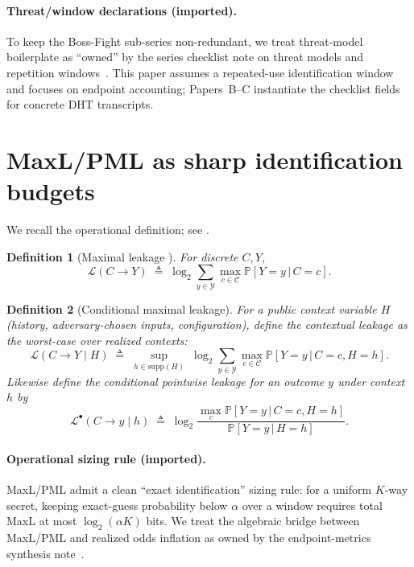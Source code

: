 \documentclass[11pt]{article}
\newcommand{\Prb}{\mathbb{P}}
\newcommand{\supp}{\mathrm{supp}}
\newcommand{\MaxL}{\mathcal{L}}
\newcommand{\PML}{\mathcal{L}^{\bullet}}
\newcommand{\given}{\,|\,}
\newcommand{\logtwo}{\log_2}
\newcommand{\C}{\mathcal{C}} %
\newcommand{\Y}{\mathcal{Y}} %
\newtheorem{definition}{Definition}
\begin{document}
\paragraph{Threat/window declarations (imported).}
To keep the Boss-Fight sub-series non-redundant, we treat threat-model boilerplate as ``owned'' by the series checklist note on threat models and repetition windows~\cite{series:threatwindows}.
This paper assumes a repeated-use identification window and focuses on endpoint accounting; Papers~B--C instantiate the checklist fields for concrete DHT transcripts.

\section{MaxL/PML as sharp identification budgets}\label{sec:maxl}
We recall the operational definition; see \cite{issa2020operational}.

\begin{definition}[Maximal leakage \cite{issa2020operational}]
For discrete $C,Y$,
\[
\MaxL(C\!\to\!Y)\;\triangleq\;\logtwo\sum_{y\in\Y}\max_{c\in\C}\Prb[Y=y\given C=c].
\]
\end{definition}


\begin{definition}[Conditional maximal leakage]\label{def:condmaxl}
For a public context variable $H$ (history, adversary-chosen inputs, configuration), define the \emph{contextual} leakage as the worst-case over realized contexts:
\[
\MaxL(C\!\to\!Y\mid H)\;\triangleq\;\sup_{h\in\supp(H)}\;\logtwo\sum_{y\in\Y}\max_{c\in\C}\Prb[Y=y\given C=c,H=h].
\]
Likewise define the conditional pointwise leakage for an outcome $y$ under context $h$ by
\[
\PML(C\!\to\!y\mid h)\;\triangleq\;\logtwo\frac{\max_{c}\Prb[Y=y\given C=c,H=h]}{\Prb[Y=y\given H=h]}.
\]
\end{definition}
\paragraph{Operational sizing rule (imported).}
MaxL/PML admit a clean ``exact identification'' sizing rule: for a uniform $K$-way secret, keeping exact-guess probability below $\alpha$ over a window requires total MaxL at most $\log_2(\alpha K)$ bits.
We treat the algebraic bridge between MaxL/PML and realized odds inflation as owned by the endpoint-metrics synthesis note~\cite{series:endpointbridge}.
\end{document}
